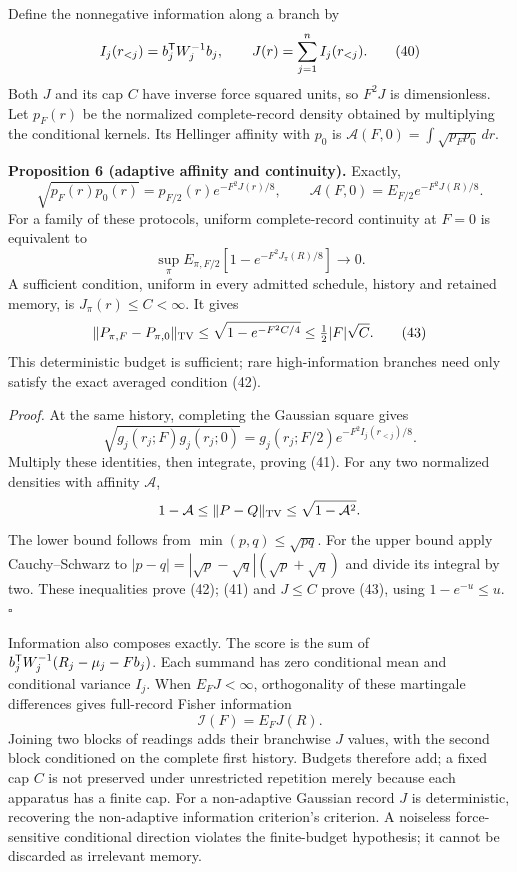 \documentclass[11pt,a4paper]{article}
\begin{document}
Define the nonnegative information along a branch by
\[I_j(r_{<j})=b_j^{\sf T}W_j^{-1}b_j,
\qquad J(r)=\sum_{j=1}^n I_j(r_{<j}).\tag{40}\] Both \(J\) and its cap
\(C\) have inverse force squared units, so \(F^2J\) is dimensionless.
Let \(p_F(r)\) be the normalized complete-record density obtained by
multiplying the conditional kernels. Its Hellinger affinity with \(p_0\)
is \(\mathcal A(F,0)=\int\sqrt{p_Fp_0}\,dr\).

\textbf{Proposition 6 (adaptive affinity and continuity).} Exactly,
\[\sqrt{p_F(r)p_0(r)}
=p_{F/2}(r)e^{-F^2J(r)/8},\qquad
\mathcal A(F,0)=E_{F/2}e^{-F^2J(R)/8}.\tag{41}\] For a family of these
protocols, uniform complete-record continuity at \(F=0\) is equivalent
to \[\sup_{\pi}E_{\pi,F/2}
       \left[1-e^{-F^2J_\pi(R)/8}\right]\longrightarrow0.
\tag{42}\] A sufficient condition, uniform in every admitted schedule,
history and retained memory, is \(J_\pi(r)\le C<\infty\). It gives
\[\|P_{\pi,F}-P_{\pi,0}\|_{\rm TV}
\le\sqrt{1-e^{-F^2C/4}}\le\tfrac12|F|\sqrt C.\tag{43}\] This
deterministic budget is sufficient; rare high-information branches need
only satisfy the exact averaged condition (42).

\emph{Proof.} At the same history, completing the Gaussian square gives
\[\sqrt{g_j(r_j;F)g_j(r_j;0)}
=g_j(r_j;F/2)e^{-F^2 I_j(r_{<j})/8}.\] Multiply these identities, then
integrate, proving (41). For any two normalized densities with affinity
\(\mathcal A\), \[1-\mathcal A\le\|P-Q\|_{\rm TV}
\le\sqrt{1-\mathcal A^2}.\] The lower bound follows from
\(\min(p,q)\le\sqrt{pq}\). For the upper bound apply Cauchy--Schwarz to
\(|p-q|=|\sqrt p-\sqrt q|(\sqrt p+\sqrt q)\) and divide its integral by
two. These inequalities prove (42); (41) and \(J\le C\) prove (43),
using \(1-e^{-u}\le u\). \(\square\)

Information also composes exactly. The score is the sum of
\(b_j^{\sf T}W_j^{-1}(R_j-\mu_j-Fb_j)\). Each summand has zero
conditional mean and conditional variance \(I_j\). When \(E_FJ<\infty\),
orthogonality of these martingale differences gives full-record Fisher
information \[\mathcal I(F)=E_FJ(R).\tag{44}\] Joining two blocks of
readings adds their branchwise \(J\) values, with the second block
conditioned on the complete first history. Budgets therefore add; a
fixed cap \(C\) is not preserved under unrestricted repetition merely
because each apparatus has a finite cap. For a non-adaptive Gaussian
record \(J\) is deterministic, recovering the non-adaptive information
criterion's criterion. A noiseless force-sensitive conditional direction
violates the finite-budget hypothesis; it cannot be discarded as
irrelevant memory.
\end{document}
